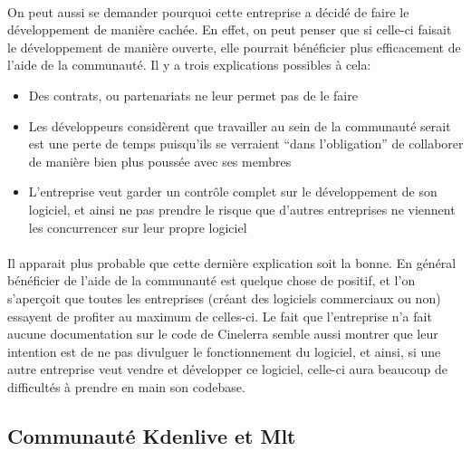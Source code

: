\paragraph{}

On peut aussi se demander pourquoi cette entreprise a décidé de faire
le développement de manière cachée. En effet, on peut penser que si
celle-ci faisait le développement de manière ouverte, elle pourrait
bénéficier plus efficacement de l'aide de la communauté. Il y a trois
explications possibles à cela:

\begin{itemize}

  \item {Des contrats, ou partenariats ne leur permet pas de le faire}

  \item {Les développeurs considèrent que travailler au sein de la
  communauté serait est une perte de temps puisqu'ils se verraient
  ``dans l'obligation'' de collaborer de manière bien plus poussée
  avec ses membres}

  \item {L'entreprise veut garder un contrôle complet sur le
    développement de son logiciel, et ainsi ne pas prendre le risque
    que d'autres entreprises ne viennent les concurrencer sur leur
    propre logiciel}

\end{itemize}

\paragraph{}

Il apparait plus probable que cette dernière explication soit la bonne.
En général bénéficier de l'aide de la communauté est quelque chose
de positif, et l'on s'aperçoit que toutes les entreprises (créant
des logiciels commerciaux ou non) essayent de profiter au maximum de
celles-ci. Le fait que l'entreprise n'a fait aucune documentation sur
le code de Cinelerra semble aussi montrer que leur intention est de
ne pas divulguer le fonctionnement du logiciel, et ainsi, si une autre
entreprise veut vendre et développer ce logiciel, celle-ci aura beaucoup
de difficultés à prendre en main son codebase.

\subsection {Communauté Kdenlive et Mlt}

